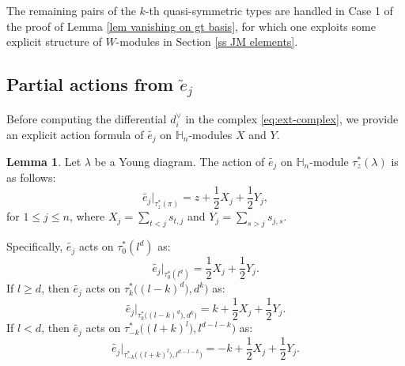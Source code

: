 \documentclass[11pt]{amsart}
\numberwithin{equation}{section}
\theoremstyle{definition}
\newtheorem{lemma}[thm]{Lemma}
\renewcommand{\phi}{\varphi}
\begin{document}
The remaining pairs of the \(k\)-th quasi-symmetric types are handled in Case 1 of the proof of Lemma \ref{lem vanishing on gt   basis}, for which one exploits some explicit structure of \(W\)-modules in Section \ref{ss JM elements}.








 \subsection{Partial actions from $\widetilde{e}_j$}
Before computing the differential $d_{i}^{\vee}$ in the complex \eqref{eq:ext-complex}, we provide an explicit action formula of $ \widetilde{e_{j}}$ on $\mathbb{H}_{n}$-modules $X$ and $Y$.

\begin{lemma}\label{lem: action of e_j}
Let \(\lambda\) be a Young diagram. The action of $ \widetilde{e_{j}}$ on $\mathbb{H}_{n}$-module $\tau_{z}^{*}(\lambda)$ is as follows:
    \begin{equation}
         \widetilde{e_{j}}|_{\tau_{z}^{*}(\pi)}=z+\frac{1}{2}X_{j}+\frac{1}{2}Y_{j},
    \end{equation}
    for $1\leq j\leq n$, where $X_{j}=\sum_{t<j}s_{t,j}$ and $Y_{j}=\sum_{s>j}s_{j,s}$.
    
    Specifically,  $ \widetilde{e_{j}}$ acts 
    on $\tau_{0}^{*}(l^{d})$ as:
    \begin{equation}
        \widetilde{e_{j}}|_{\tau_{0}^{*}(l^{d})}=\frac{1}{2}X_{j}+\frac{1}{2}Y_{j}.
\end{equation}
If $l\geq d$, then $\widetilde{e_{j}}$ acts 
    on $\tau_{k}^{*}\big((l-k)^{d}),d^{k}\big)$ as: 
\begin{equation}
    \widetilde{e_{j}}|_{\tau_{k}^{*}\big((l-k)^{d}),d^{k}\big)}=k+\frac{1}{2}X_{j}+\frac{1}{2}Y_{j}.
\end{equation}
If $l<d$, then $\widetilde{e_{j}}$ acts 
    on $\tau_{-k}^{*}\big((l+k)^{l}),l^{d-l-k}\big)$ as: 
\begin{equation}
    \widetilde{e_{j}}|_{\tau_{-k}^{*}\big((l+k)^{l}),l^{d-l-k}\big)}=-k+\frac{1}{2}X_{j}+\frac{1}{2}Y_{j}.
\end{equation}
\end{lemma}
\end{document}
